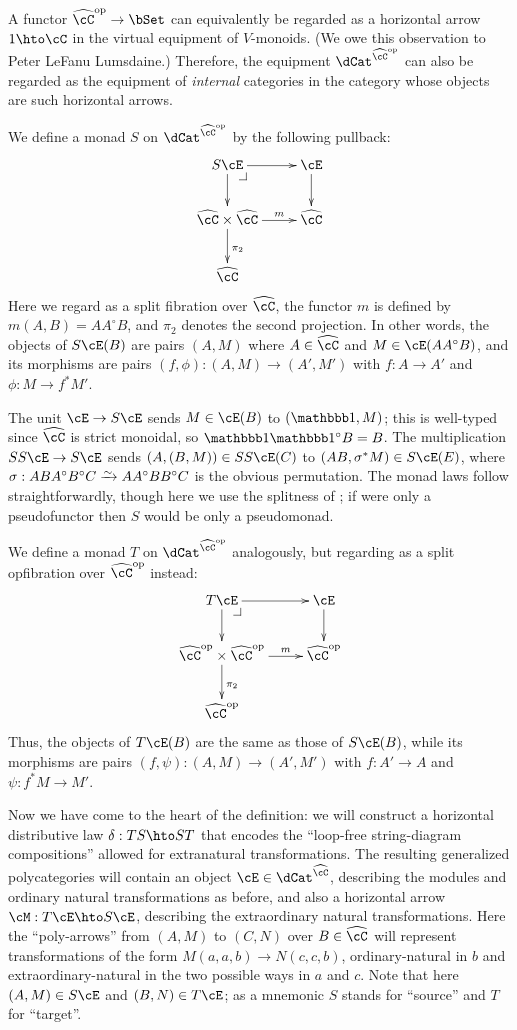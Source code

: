 \documentclass{amsart}
\newcommand{\C}{\cC}
\renewcommand{\Chat}{\ensuremath{\widehat{\C}}\xspace}
\newcommand{\E}{\cE}
\newcommand{\one}{\lone}
\renewcommand{\o}{^{\circ}}
\begin{document}
\begin{rmk}
  A functor $\Chat\op\to\bSet$ can equivalently be regarded as a horizontal arrow $1\hto \C$ in the virtual equipment of $V$-monoids.
  (We owe this observation to Peter LeFanu Lumsdaine.)
  Therefore, the equipment $\dCat^{\Chat\op}$ can also be regarded as the equipment of \emph{internal} categories in the category whose objects are such horizontal arrows.
\end{rmk}

We define a monad $S$ on $\dCat^{\Chat\op}$ by the following pullback:
\[ \xymatrix{ S \E \ar[r] \ar[d] \pullback & \E \ar[d] \\
  \Chat\times\Chat \ar[r]^-m \ar[d]^{\pi_2} & \Chat \\
  \Chat }\]
Here we regard \E as a split fibration over \Chat, the functor $m$ is defined by $m(A,B) = A A\o B$, and $\pi_2$ denotes the second projection.
In other words, the objects of $S\E(B)$ are pairs $(A,M)$ where $A\in\Chat$ and $M\in\E(A A\o B)$, and its morphisms are pairs $(f,\phi) : (A,M)\to (A',M')$ with $f:A\to A'$ and $\phi : M \to f^*M'$.

The unit $\E\to S\E$ sends $M\in \E(B)$ to $(\one,M)$; this is well-typed since $\Chat$ is strict monoidal, so $\one\one\o B = B$.
The multiplication $SS\E\to S\E$ sends $(A,(B,M)) \in S S \E(C)$ to $(AB,\sigma^* M)\in S\E(E)$, where $\sigma : ABA\o B\o C \toiso A A\o B B\o C$ is the obvious permutation.
The monad laws follow straightforwardly, though here we use the splitness of \E; if \E were only a pseudofunctor then $S$ would be only a pseudomonad.

We define a monad $T$ on $\dCat^{\Chat\op}$ analogously, but regarding \E as a split opfibration over $\Chat\op$ instead:
\[ \xymatrix{ T \E \ar[r] \ar[d] \pullback & \E \ar[d] \\
  \Chat\op\times\Chat\op \ar[r]^-m \ar[d]^{\pi_2} & \Chat\op \\
  \Chat\op }\]
Thus, the objects of $T\E(B)$ are the same as those of $S\E(B)$, while its morphisms are pairs $(f,\psi) : (A,M)\to (A',M')$ with $f:A'\to A$ and $\psi : f^* M \to M'$.

Now we have come to the heart of the definition: we will construct a horizontal distributive law $\delta : TS \hto ST$ that encodes the ``loop-free string-diagram compositions'' allowed for extranatural transformations.
The resulting generalized polycategories will contain an object $\E\in \dCat^{\Chat}$, describing the modules and ordinary natural transformations as before, and also a horizontal arrow $\cM: T\E \hto S\E$, describing the extraordinary natural transformations.
Here the ``poly-arrows'' from $(A,M)$ to $(C,N)$ over $B\in\Chat$ will represent transformations of the form $M(a,a,b) \to N(c,c,b)$, ordinary-natural in $b$ and extraordinary-natural in the two possible ways in $a$ and $c$.
Note that here $(A,M)\in S\E$ and $(B,N)\in T\E$; as a mnemonic $S$ stands for ``source'' and $T$ for ``target''.
\end{document}
